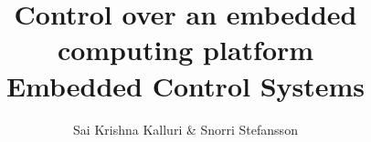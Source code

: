 \documentclass{article}
\begin{document}
\title{ {\fontsize{16}{1} \selectfont Control over an embedded computing platform} {\\ \fontsize{13}{1} \selectfont \textbf{Embedded Control Systems}} }
\author{Sai Krishna Kalluri \& Snorri Stefansson }

\maketitle
%









\printbibliography
\end{document}
